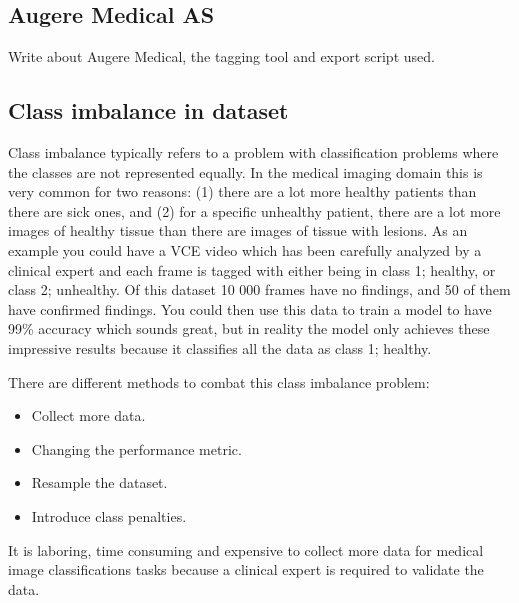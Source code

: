 \documentclass[thesis.tex]{subfiles}
\begin{document}
\subsection{Augere Medical AS} \label{sec:augere_medical}
Write about Augere Medical, the tagging tool and export script used.



\subsection{Class imbalance in dataset}
Class imbalance typically refers to a problem with classification problems where the classes are not represented equally. In the medical imaging domain this is very common for two reasons: (1) there are a lot more healthy patients than there are sick ones, and (2) for a specific unhealthy patient, there are a lot more images of healthy tissue than there are images of tissue with lesions.
As an example you could have a VCE video which has been carefully analyzed by a clinical expert and each frame is tagged with either being in class 1; healthy, or class 2; unhealthy. Of this dataset 10 000 frames have no findings, and 50 of them have confirmed findings. You could then use this data to train a model to have 99\% accuracy which sounds great, but in reality the model only achieves these impressive results because it classifies all the data as class 1; healthy.

There are different methods to combat this class imbalance problem:
\begin{itemize}
\item Collect more data.
\item Changing the performance metric.
\item Resample the dataset.
\item Introduce class penalties.
\end{itemize}
It is laboring, time consuming and expensive to collect more data for medical image classifications tasks because a clinical expert is required to validate the data. 
\end{document}
